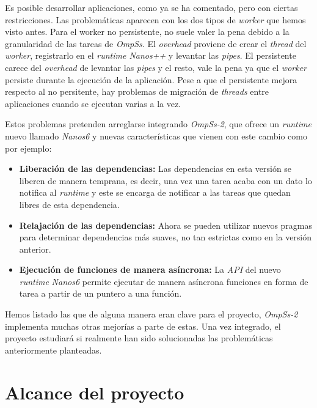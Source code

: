 Es posible desarrollar aplicaciones, como ya se ha comentado, pero con ciertas restricciones. Las problemáticas aparecen con los dos tipos de \textit{worker} que hemos visto antes. Para el worker no persistente, no suele valer la pena debido a la granularidad de las tareas de \textit{OmpSs}. El \textit{overhead} proviene de crear el \textit{thread} del \textit{worker}, registrarlo en el \textit{runtime Nanos++} y levantar las \textit{pipes}. El persistente carece del \textit{overhead} de levantar las \textit{pipes} y el resto, vale la pena ya que el \textit{worker} persiste durante la ejecución de la aplicación. Pese a que el persistente mejora respecto al no persitente, hay problemas de migración de \textit{threads} entre aplicaciones cuando se ejecutan varias a la vez.
\par\bigskip

Estos problemas pretenden arreglarse integrando \textit{OmpSs-2}, que ofrece un \textit{runtime} nuevo llamado \textit{Nanos6} y nuevas características que vienen con este cambio como por ejemplo:

\begin{itemize}
\item \textbf{Liberación de las dependencias:} Las dependencias en esta versión se liberen de manera temprana, es decir, una vez una tarea acaba con un dato lo notifica al \textit{runtime} y este se encarga de notificar a las tareas que quedan libres de esta dependencia.
 \item \textbf{Relajación de las dependencias:} Ahora se pueden utilizar nuevos pragmas para determinar dependencias más suaves, no tan estrictas como en la versión anterior.
 \item \textbf{Ejecución de funciones de manera asíncrona:} La \textit{API} del nuevo \textit{runtime} \textit{Nanos6} permite ejecutar de manera asíncrona funciones en forma de tarea a partir de un puntero a una función.
\end{itemize}

Hemos listado las que de alguna manera eran clave para el proyecto, \textit{OmpSs-2} implementa muchas otras mejorías a parte de estas\cite{OmpSs2reference}. Una vez integrado, el proyecto estudiará si realmente han sido solucionadas las problemáticas anteriormente planteadas.

\section{Alcance del proyecto}

